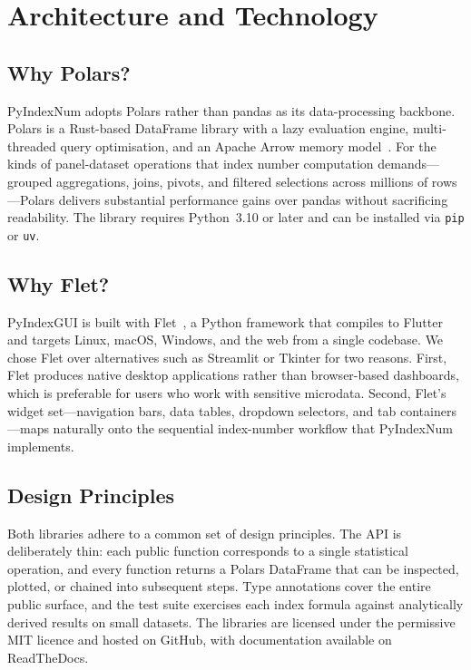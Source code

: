 \documentclass[12pt,a4paper]{article}
\begin{document}
\section{Architecture and Technology}
\label{sec:architecture}

\subsection{Why Polars?}

PyIndexNum adopts Polars rather than pandas as its data-processing backbone. Polars is a Rust-based DataFrame library with a lazy evaluation engine, multi-threaded query optimisation, and an Apache Arrow memory model~\autocite{nahrstedt2024polars}. For the kinds of panel-dataset operations that index number computation demands---grouped aggregations, joins, pivots, and filtered selections across millions of rows---Polars delivers substantial performance gains over pandas without sacrificing readability. The library requires Python~3.10 or later and can be installed via \texttt{pip} or \texttt{uv}.

\subsection{Why Flet?}

PyIndexGUI is built with Flet~\autocite{flet2024framework}, a Python framework that compiles to Flutter and targets Linux, macOS, Windows, and the web from a single codebase. We chose Flet over alternatives such as Streamlit or Tkinter for two reasons. First, Flet produces native desktop applications rather than browser-based dashboards, which is preferable for users who work with sensitive microdata. Second, Flet's widget set---navigation bars, data tables, dropdown selectors, and tab containers---maps naturally onto the sequential index-number workflow that PyIndexNum implements.

\subsection{Design Principles}

Both libraries adhere to a common set of design principles. The API is deliberately thin: each public function corresponds to a single statistical operation, and every function returns a Polars DataFrame that can be inspected, plotted, or chained into subsequent steps. Type annotations cover the entire public surface, and the test suite exercises each index formula against analytically derived results on small datasets. The libraries are licensed under the permissive MIT licence and hosted on GitHub, with documentation available on ReadTheDocs.
\end{document}
